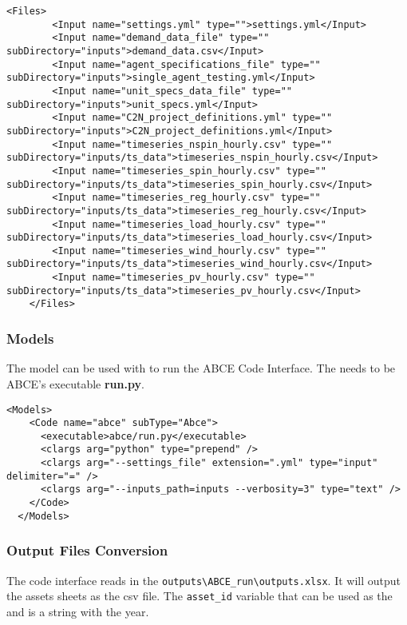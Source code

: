 \begin{lstlisting}[style=XML]
    <Files>
        <Input name="settings.yml" type="">settings.yml</Input>
        <Input name="demand_data_file" type="" subDirectory="inputs">demand_data.csv</Input>
        <Input name="agent_specifications_file" type="" subDirectory="inputs">single_agent_testing.yml</Input>
        <Input name="unit_specs_data_file" type="" subDirectory="inputs">unit_specs.yml</Input>
        <Input name="C2N_project_definitions.yml" type="" subDirectory="inputs">C2N_project_definitions.yml</Input>
        <Input name="timeseries_nspin_hourly.csv" type="" subDirectory="inputs/ts_data">timeseries_nspin_hourly.csv</Input>
        <Input name="timeseries_spin_hourly.csv" type="" subDirectory="inputs/ts_data">timeseries_spin_hourly.csv</Input>
        <Input name="timeseries_reg_hourly.csv" type="" subDirectory="inputs/ts_data">timeseries_reg_hourly.csv</Input>
        <Input name="timeseries_load_hourly.csv" type="" subDirectory="inputs/ts_data">timeseries_load_hourly.csv</Input>
        <Input name="timeseries_wind_hourly.csv" type="" subDirectory="inputs/ts_data">timeseries_wind_hourly.csv</Input>
        <Input name="timeseries_pv_hourly.csv" type="" subDirectory="inputs/ts_data">timeseries_pv_hourly.csv</Input>
    </Files>
\end{lstlisting}

\subsubsection{Models}

The  model can be used with
 to run the ABCE Code Interface. The  needs to be ABCE's executable \textbf{run.py}.

\begin{lstlisting}[style=XML]
  <Models>
    <Code name="abce" subType="Abce">
      <executable>abce/run.py</executable>
      <clargs arg="python" type="prepend" />
      <clargs arg="--settings_file" extension=".yml" type="input" delimiter="=" />
      <clargs arg="--inputs_path=inputs --verbosity=3" type="text" />
    </Code>
  </Models>
\end{lstlisting}

\subsubsection{Output Files Conversion}

The code interface reads in the \verb'outputs\ABCE_run\outputs.xlsx'. 
It will output the assets sheets as the csv file. The \texttt{asset\_id} 
variable that can be used as the  and is a
string with the year. 

